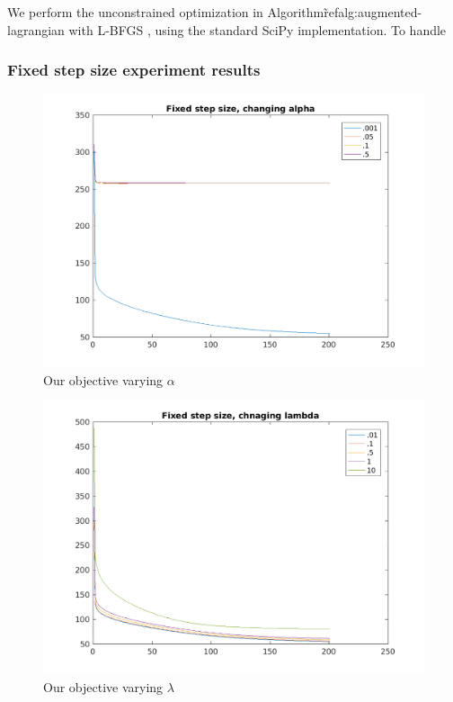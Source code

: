 \documentclass{article}
\newcommand{\0}{\mathrm{0}}
\newcommand{\1}{\mathrm{1}}
\newcommand{\red}[1]{{\color{red}{#1}}}
\begin{document}
We perform the unconstrained optimization in Algorithm\~ref{alg:augmented-lagrangian} with L-BFGS \cite{liu1989limited}, using the standard SciPy implementation. To handle 


\subsubsection{Fixed step size experiment results}
\red{TODO: clean up}


\begin{figure}
  \includegraphics[width=\textwidth]{fixed-step-alpha.png}
  \caption{Our objective varying $\alpha$}
\end{figure}

\begin{figure}
  \includegraphics[width=\textwidth]{fixed-step-lambda.png}
  \caption{Our objective varying $\lambda$}
\end{figure}
\end{document}
